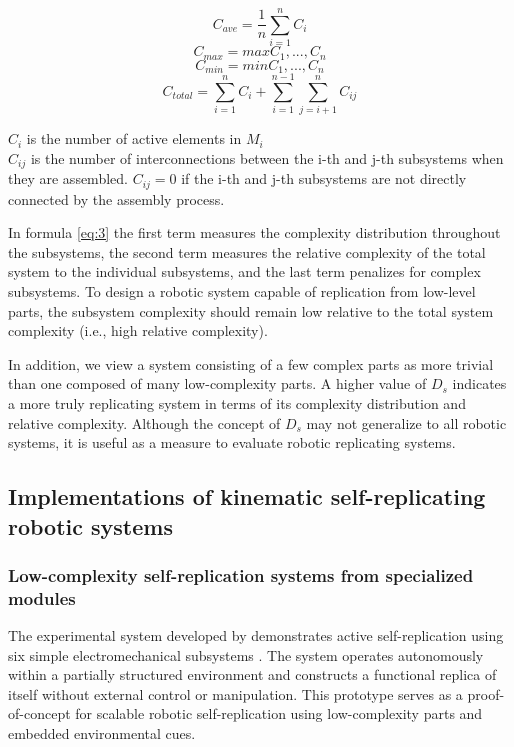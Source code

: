 \[ C_{ave} = \frac{1}{n} \sum_{i=1}^{n}{C_i} \] 
\[ C_{max} = max{C_1,...,C_n} \]
\[ C_{min} = min{C_1,...,C_n} \]
\[ C_{total} = \sum_{i=1}^{n}{C_i} + \sum_{i=1}^{n-1} \sum_{j=i+1}^{n}{C_{ij}} \]

$C_i$ is the number of active elements in $M_i$ \\ 
$C_{ij}$ is the number of interconnections between the i-th and j-th subsystems when they are assembled. 
$C_{ij}= 0$ if the i-th and j-th subsystems are not directly connected by the assembly process. 

In formula \ref{eq:3} the first term measures the complexity distribution
throughout the subsystems, the second term measures the relative 
complexity of the total system to the individual subsystems, 
and the last term penalizes for complex subsystems. 
To design a robotic system capable of replication from low-level
parts, the subsystem complexity should remain low relative to the
total system complexity (i.e., high relative complexity). 

In addition, we view a system consisting of a few complex parts as more trivial
than one composed of many low-complexity parts. A higher value
of $D_s$ indicates a more truly replicating system in terms of its 
complexity distribution and relative complexity. Although the concept
of $D_s$ may not generalize to all robotic systems, it is useful as a
measure to evaluate robotic replicating systems.



\subsection{Implementations of kinematic self-replicating robotic systems}
\subsubsection{Low-complexity self-replication systems from specialized modules}

The experimental system developed by \citeauthor{Lee2007Robotic} demonstrates active 
self-replication using six simple electromechanical subsystems \cite{Lee2007Robotic}. 
The system operates autonomously within a partially structured environment and 
constructs a functional replica of itself without external control or manipulation. 
This prototype serves as a proof-of-concept for scalable robotic 
self-replication using low-complexity parts and embedded environmental cues.

